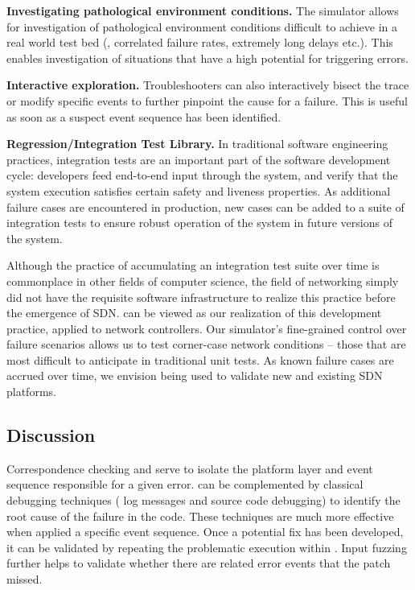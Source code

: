 {\noindent\textbf{Investigating pathological environment conditions.} The simulator allows for investigation
of pathological environment conditions difficult to achieve in a real world test bed
(\eg{}, correlated failure rates, extremely long delays etc.). This enables
investigation of situations that have a high potential for triggering errors.

\noindent\textbf{Interactive exploration.} Troubleshooters can also interactively bisect
the trace or modify specific events to further pinpoint the cause for a failure.
This is useful as soon as a suspect event sequence has been identified.

\noindent\textbf{Regression/Integration Test Library.} In traditional software engineering practices,
integration tests are an
important part of the software development cycle: developers feed end-to-end
input through the system, and verify that the system execution satisfies
certain safety and liveness properties. As additional failure cases are encountered in
production, new cases can be added to a suite of integration tests to
ensure robust operation of the system in future versions of the system.

Although the practice of accumulating an integration test suite over time is
commonplace in other fields of computer science, the field of networking
simply did not have the requisite software infrastructure to realize this practice before the emergence
of SDN. \Simulator{} can be viewed as our realization
of this development practice, applied to network controllers. Our simulator's fine-grained control over
failure scenarios allows us to test corner-case network conditions -- those
that are most difficult to anticipate in traditional unit tests.
As known failure cases are accrued over time, we envision \simulator{} being used to validate
new and existing SDN platforms.

\subsection{Discussion}

Correspondence checking and \simulator{} serve to isolate the platform layer and
event sequence responsible for a given error. \projectname{} can be
complemented by classical debugging techniques (\eg{} log messages and source
code debugging) to identify the root cause of
the failure in the code. These techniques are much more
effective when applied a specific event sequence. Once a
potential fix has been developed, it can be validated by repeating the
problematic execution within \projectname{}. Input fuzzing further helps to
validate whether there are
related error events that the patch missed.

} %

